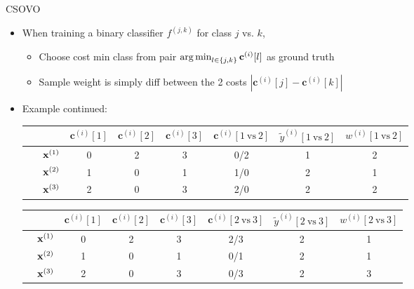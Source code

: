 \documentclass[11pt,compress,t,notes=noshow, aspectratio=169, xcolor=table]{beamer}
\newcommand{\cv}{\mathbf{c}}
\begin{document}
\begin{frame}{CSOVO}
    \begin{itemize}
        \item When training a binary classifier $f^{(j, k)}$ for class $j$ vs. $k$,
        \begin{itemize}
            \item Choose cost min class from pair $\argmin_{l \in \{j, k\}} \cv^{(i)}[l]$ as ground truth 
            
            \item Sample weight is simply diff between the 2 costs      $|\cv^{(i)}[j] - \cv^{(i)}[k]|$

        \end{itemize}
        
        \item Example continued:
\begin{center}
    \footnotesize
                            \begin{tabular}{cc|ccc|ccc}\
        			& & $\cv^{(i)}[1]$ & $\cv^{(i)}[2]$ & $\cv^{(i)}[3]$ & $\cv^{(i)}[1 \ \text{vs} \ 2]$ & $\tilde{y}^{( i)}[1 \ \text{vs} \ 2]$ & $w^{(i)}[1 \ \text{vs} \ 2]$\\
        			\hline & $\mathbf{x}^{(1)}$ & 0 & 2 & 3 & 0/2 & 1 & 2\\
        			& $\mathbf{x}^{(2)}$ & 1 & 0 & 1 & 1/0 & 2 & 1 \\
                 	& $\mathbf{x}^{(3)}$ & 2 & 0 & 3 & 2/0 & 2 & 2\\
                \end{tabular}

                \begin{tabular}{cc|ccc|ccc}
        			& & $\cv^{(i)}[1]$ & $\cv^{(i)}[2]$ & $\cv^{(i)}[3]$ & $\cv^{(i)}[2 \ \text{vs} \ 3]$ & $\tilde{y}^{( i)}[2 \ \text{vs} \ 3]$ & $w^{(i)}[2 \ \text{vs} \ 3]$\\
        			\hline & $\mathbf{x}^{(1)}$ & 0 & 2 & 3 & 2/3 & 2 & 1\\
        			& $\mathbf{x}^{(2)}$ & 1 & 0 & 1 & 0/1 & 2 & 1\\
                 	& $\mathbf{x}^{(3)}$ & 2 & 0 & 3 & 0/3 & 2 & 3\\
                \end{tabular}
\end{center}

    \end{itemize}
\end{frame}
\end{document}
